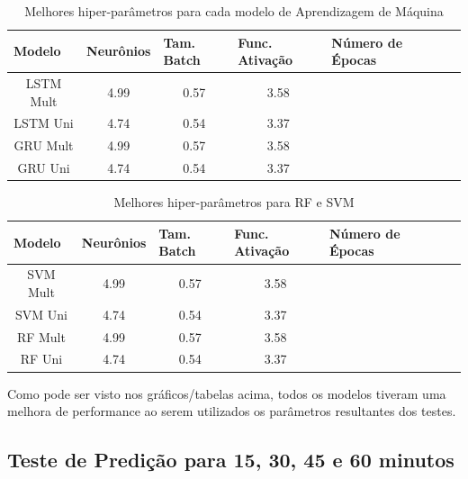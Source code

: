 \begin{table}[H]
    \caption{Melhores hiper-parâmetros para cada modelo de Aprendizagem de Máquina}
    \label{table:hiper-param-lstm}
    \begin{center}
    \begin{tabular}{ccccccc}
    \hline
    \multicolumn{1}{l}{\textbf{Modelo}} & \multicolumn{1}{l}{\textbf{Neurônios}} & \multicolumn{1}{l}{\textbf{Tam. Batch}} & \multicolumn{1}{l}{\textbf{Func. Ativação}} & \multicolumn{1}{l}{\textbf{Número de Épocas}}\\
    \hline
    LSTM Mult & 4.99 &  0.57 & 3.58  \\ 
    LSTM Uni & 4.74 &  0.54 & 3.37  \\
    GRU Mult & 4.99 &  0.57 & 3.58  \\ 
    GRU Uni & 4.74 &  0.54 & 3.37  \\
    \hline
    \end{tabular}
    \end{center}
\end{table}


\begin{table}[H]
    \caption{Melhores hiper-parâmetros para RF e SVM}
    \label{table:hiper-param}
    \begin{center}
    \begin{tabular}{ccccccc}
    \hline
    \multicolumn{1}{l}{\textbf{Modelo}} & \multicolumn{1}{l}{\textbf{Neurônios}} & \multicolumn{1}{l}{\textbf{Tam. Batch}} & \multicolumn{1}{l}{\textbf{Func. Ativação}} & \multicolumn{1}{l}{\textbf{Número de Épocas}}\\
    \hline
    SVM Mult & 4.99 &  0.57 & 3.58  \\ 
    SVM Uni & 4.74 &  0.54 & 3.37  \\
    RF Mult & 4.99 &  0.57 & 3.58  \\ 
    RF Uni & 4.74 &  0.54 & 3.37  \\
    \hline
    \end{tabular}
    \end{center}
\end{table}



Como pode ser visto nos gráficos/tabelas acima, todos os modelos tiveram uma melhora de performance ao serem utilizados os parâmetros resultantes dos testes.

\subsection{Teste de Predição para 15, 30, 45 e 60 minutos}

